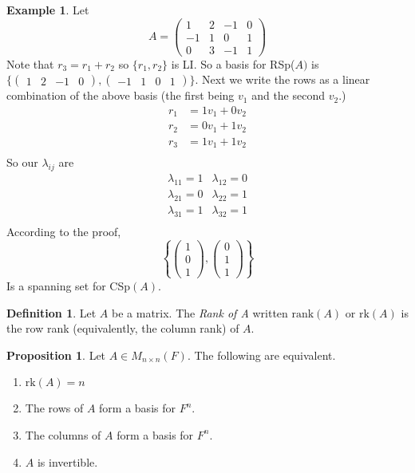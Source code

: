 \documentclass{report}
\theoremstyle{remark}
\theoremstyle{definition}
\newtheorem{definition}[theorem]{Definition}
\theoremstyle{definition}
\newtheorem{example}[theorem]{Example}
\theoremstyle{theorem}
\newtheorem{proposition}[theorem]{Proposition}
\begin{document}
\begin{example}
Let 
\[A = \begin{pmatrix}
1&2&-1&0\\
-1&1&0&1\\
0&3&-1&1
\end{pmatrix}\]
Note that $r_3 = r_1 + r_2$ so $\{r_1, r_2\}$ is LI. So a basis for RSp($A)$ is $\{\begin{pmatrix}1&2&-1&0\end{pmatrix}, \begin{pmatrix}-1&1&0&1\end{pmatrix}\}$. Next we write the rows as a linear combination of the above basis (the first being $v_1$ and the second $v_2$.)
\begin{align*}
    r_1 &= 1v_1 + 0v_2\\
    r_2 &= 0v_1 + 1v_2\\
    r_3 &= 1v_1 + 1v_2\\
\end{align*}
So our $\lambda_{ij}$ are\\
\[
\begin{array}{cc}
\lambda_{11}=1&\lambda_{12}=0\\
\lambda_{21}=0&\lambda_{22}=1\\
\lambda_{31}=1&\lambda_{32}=1\\
\end{array} \]
According to the proof,
\[\left\{\begin{pmatrix}1\\0\\1\end{pmatrix}, \begin{pmatrix}0\\1\\1\end{pmatrix}\right\}\]
Is a spanning set for CSp$(A)$.
\end{example}
\begin{definition}
Let $A$ be a matrix. The \emph{Rank of A} written $\text{rank}(A)$ or $\text{rk}(A)$ is the row rank (equivalently, the column rank) of $A.$
\end{definition}
\begin{proposition}
Let $A \in M_{n \times n}(F).$ The following are equivalent.
\begin{enumerate}
    \item $\mathrm{rk}(A) = n$
    \item The rows of $A$ form a basis for $F^n$.
    \item The columns of $A$ form a basis for $F^n$.
    \item $A$ is invertible.
\end{enumerate}
\end{proposition}
\end{document}
